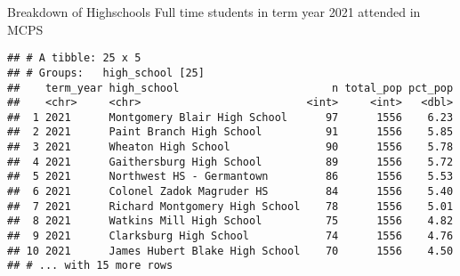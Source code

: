 \documentclass[]{article}
\newenvironment{Shaded}{\begin{snugshade}}{\end{snugshade}}
\newcommand{\DataTypeTok}[1]{\textcolor[rgb]{0.13,0.29,0.53}{#1}}
\newcommand{\DecValTok}[1]{\textcolor[rgb]{0.00,0.00,0.81}{#1}}
\newcommand{\KeywordTok}[1]{\textcolor[rgb]{0.13,0.29,0.53}{\textbf{#1}}}
\newcommand{\NormalTok}[1]{#1}
\newcommand{\OperatorTok}[1]{\textcolor[rgb]{0.81,0.36,0.00}{\textbf{#1}}}
\newcommand{\OtherTok}[1]{\textcolor[rgb]{0.56,0.35,0.01}{#1}}
\newcommand{\StringTok}[1]{\textcolor[rgb]{0.31,0.60,0.02}{#1}}
\begin{document}
Breakdown of Highschools Full time students in term year 2021 attended
in MCPS

\begin{Shaded}
\end{Shaded}

\begin{verbatim}
## # A tibble: 25 x 5
## # Groups:   high_school [25]
##    term_year high_school                        n total_pop pct_pop
##    <chr>     <chr>                          <int>     <int>   <dbl>
##  1 2021      Montgomery Blair High School      97      1556    6.23
##  2 2021      Paint Branch High School          91      1556    5.85
##  3 2021      Wheaton High School               90      1556    5.78
##  4 2021      Gaithersburg High School          89      1556    5.72
##  5 2021      Northwest HS - Germantown         86      1556    5.53
##  6 2021      Colonel Zadok Magruder HS         84      1556    5.40
##  7 2021      Richard Montgomery High School    78      1556    5.01
##  8 2021      Watkins Mill High School          75      1556    4.82
##  9 2021      Clarksburg High School            74      1556    4.76
## 10 2021      James Hubert Blake High School    70      1556    4.50
## # ... with 15 more rows
\end{verbatim}
\end{document}
